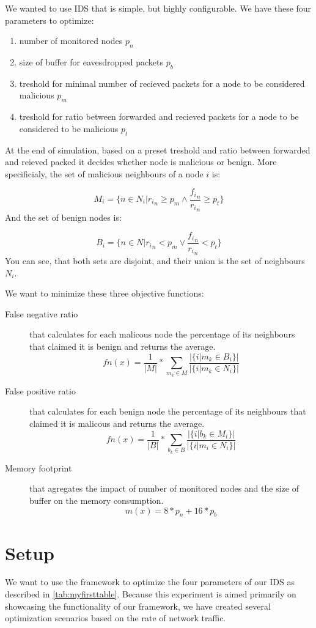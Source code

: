 \documentclass[12pt,oneside]{fithesis2}
\begin{document}
We wanted to use IDS that is simple, but highly configurable. 
We have these four parameters to optimize:
\begin{enumerate}
\item number of monitored nodes $p_n$
\item size of buffer for eavesdropped packets $p_b$
\item treshold for minimal number of recieved packets for a node to be considered malicious $p_m$
\item treshold for ratio between forwarded and recieved packets for a node to be considered to be malicious $p_t$
\end{enumerate}

At the end of simulation, based on a preset treshold and ratio between forwarded and reieved packed it decides whether node is malicious or benign. More specificialy, the set of malicious neighbours of a node $i$ is:

$$ M_i = \{n \in N_i|{r_i}_n \geq p_m \land \frac{{f_i}_n}{{r_i}_n} \geq p_t \} $$
And the set of benign nodes is:

$$B_i = \{n \in N|{r_i}_n < p_m \lor \frac{{f_i}_n}{{r_i}_n} < p_t \} $$
You can see, that both sets are disjoint, and their union is the set of neighbours $N_i$. 

We want to minimize these three objective functions:
\begin{description}
\item[False negative ratio] that calculates for each malicous node the percentage of its neighbours that claimed it is benign and returns the average.
$$fn(x) = \frac{1}{|M|}* \sum\limits_{m_k\in M} \frac{|\{i|m_k \in B_i\}|}{|\{i|m_k \in N_i\}|} $$
\item[False positive ratio] that calculates for each benign node the percentage of its neighbours that claimed it is malicous and returns the average.
$$fn(x) = \frac{1}{|B|}* \sum\limits_{b_k\in B} \frac{|\{i|b_k \in M_i\}|}{|\{i|m_i \in N_i\}|} $$
\item[Memory footprint] that agregates the impact of number of monitored nodes and the size of buffer on the memory consumption.
$$m(x) = 8*p_n + 16*p_b $$
\end{description}

\section{Setup}
We want to use the framework to optimize the four parameters of our IDS as described in \ref{tab:myfirsttable}. 
Because this experiment is aimed primarily on showcasing the functionality of our framework, we have created several optimization scenarios based on the rate of network traffic.
\end{document}
